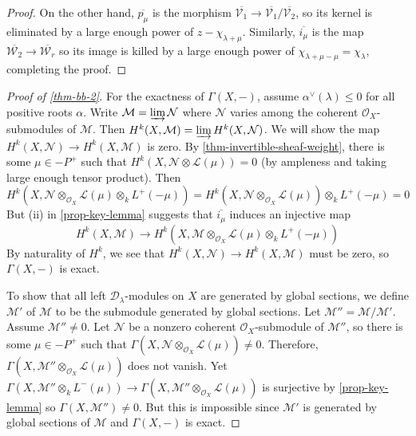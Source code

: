 \documentclass[11pt, a4paper]{article}
\theoremstyle{definition}
\begin{document}
\begin{proof}
        On the other hand, $\overline{p_\mu}$ is the morphism $\overline{\mathcal V_1}\to\overline{\mathcal V_1}/\overline{\mathcal V_2}$, so its kernel is eliminated by a large enough power of $z-\chi_{\lambda+\mu}$. Similarly, $\overline{i_\mu}$ is the map $\overline{\mathcal W_2}\to \overline{\mathcal W_r}$ so its image is killed by a large enough power of $\chi_{\lambda+\mu-\mu}=\chi_\lambda$, completing the proof. 
    \end{proof}
    \begin{proof}[Proof of \cref{thm-bb-2}]
        For the exactness of $\Gamma(X, -)$, assume $\alpha^\vee(\lambda)\leqslant 0$ for all positive roots $\alpha$. Write $\mathcal M=\varinjlim \mathcal N$ where $\mathcal N$ varies among the coherent $\mathcal O_X$-submodules of $\mathcal M$. Then $H^k(X,\mathcal M)=\varinjlim H^k(X,\mathcal N)$. We will show the map $H^k(X,\mathcal N)\to H^k(X,\mathcal M)$ is zero. By \cref{thm-invertible-sheaf-weight}, there is some $\mu\in -P^+$ such that $H^k(X,\mathcal N\otimes\mathcal L(\mu))=0$ (by ampleness and taking large enough tensor product). Then
        \[H^k(X, \mathcal N\otimes_{\mathcal O_X}\mathcal L(\mu)\otimes_k L^+(-\mu))=H^k(X, \mathcal N\otimes_{\mathcal O_X}\mathcal L(\mu))\otimes_k L^+(-\mu)=0\]
        But (ii) in \cref{prop-key-lemma} suggests that $\overline{i_\mu}$ induces an injective map 
        \[H^k(X,\mathcal M)\to H^k(X, \mathcal M\otimes_{\mathcal O_X}\mathcal L(\mu)\otimes_k L^+(-\mu))\]By naturality of $H^k$, we see that $H^k(X,\mathcal N)\to H^k(X, \mathcal M)$ must be zero, so $\Gamma(X, -)$ is exact.
        

        To show that all left $\mathcal D_\lambda$-modules on $X$ are generated by global sections, we define $\mathcal M'$ of $\mathcal M$ to be the submodule generated by global sections. Let $\mathcal M''=\mathcal M/\mathcal M'$. Assume $\mathcal M''\neq 0$. Let $\mathcal N$ be a nonzero coherent $\mathcal O_X$-submodule of $\mathcal M''$, so there is some $\mu\in -P^+$ such that $\Gamma(X, \mathcal N\otimes_{\mathcal O_X}\mathcal L(\mu))\neq 0$. Therefore, $\Gamma(X, \mathcal M''\otimes_{\mathcal O_X}\mathcal L(\mu))$ does not vanish. Yet $\Gamma(X, \mathcal M''\otimes_k L^-(\mu))\to \Gamma(X, \mathcal M''\otimes_{\mathcal O_X}\mathcal L(\mu))$ is surjective by \cref{prop-key-lemma} so $\Gamma(X, \mathcal M'')\neq 0$. But this is impossible since $\mathcal M'$ is generated by global sections of $\mathcal M$ and $\Gamma(X, -)$ is exact.
    \end{proof}
\end{document}
